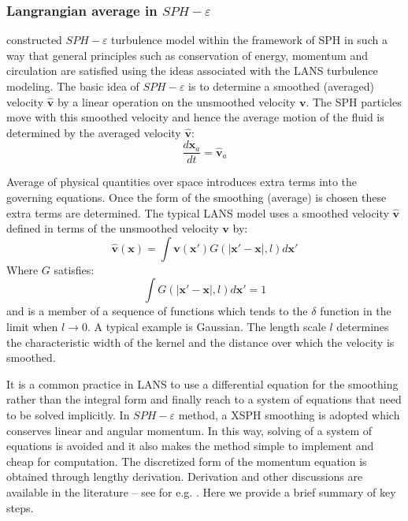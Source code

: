 \documentclass[journal abbreviation, manuscript]{copernicus}
\begin{document}
\subsubsection{Langrangian average in $SPH-\varepsilon$}
\citet{monaghan2011turbulence} constructed $SPH-\varepsilon$ turbulence model within the framework of SPH in such a way that general principles such as conservation of energy, momentum and circulation are satisfied using the ideas associated with the LANS turbulence modeling. The basic idea of $SPH-\varepsilon$ is to determine a smoothed (averaged) velocity $\widehat{\textbf{v}}$ by a linear operation on the unsmoothed velocity $\textbf{v}$. The SPH particles move with this smoothed velocity and hence the average motion of the fluid is determined by the averaged velocity $\widehat{\textbf{v}}$:
\begin{equation}
\dfrac{d \textbf{x}_a}{dt} = \widehat{\textbf{v}}_a \label{eq:gov-update-pos-turbulence}
\end{equation}

Average of physical quantities over space introduces extra terms into the governing equations. Once the form of the smoothing (average) is chosen these extra terms are determined.
The typical LANS model uses a smoothed velocity $\widehat{\textbf{v}}$ 
defined in terms of the unsmoothed velocity $\textbf{v}$ by:
\begin{equation}
\widehat{\textbf{v}}\left(\textbf{x}\right)=\int \textbf{v}\left(\textbf{x} \prime\right)G\left(\vert \textbf{x} \prime - \textbf{x} \vert, l\right) d\textbf{x} \prime
\end{equation}
Where $G$ satisfies:
\begin{equation}
\int G\left(\vert \textbf{x} \prime - \textbf{x} \vert, l\right) d\textbf{x} \prime =1
\end{equation}
and is a member of a sequence of functions which tends to the $\delta$ function in the limit when $ l\rightarrow 0$. A typical example is Gaussian.
The length scale $l$ determines the characteristic width of the kernel and the distance over which the velocity is smoothed.

It is a common practice in LANS to use a differential equation for the smoothing rather than the integral form and finally reach to a system of equations that need to be solved implicitly. In $SPH-\varepsilon$ method, a XSPH \citep{monaghan1989problem} smoothing is adopted which conserves linear and angular momentum. In this way, solving of a system of equations is avoided and it also makes the method simple to implement and cheap for computation. 
The discretized form of the momentum equation is obtained through lengthy derivation. Derivation and other discussions are available in the literature -- see for e.g. \citep{monaghan2011turbulence}. Here we provide a brief summary of key steps.
\end{document}
